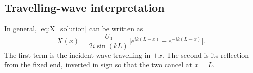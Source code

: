 \subsection{Travelling-wave interpretation}
In general, \cref{eq:X_solution} can be written as
\begin{equation}
  X(x) = \frac{U_0}{2i\sin(kL)}\Big[e^{ik(L-x)} - e^{-ik(L-x)}\Big].
\end{equation}
The first term is the incident wave travelling in $+x$. The second is its
reflection from the fixed end, inverted in sign so that the two cancel at
$x=L$.
